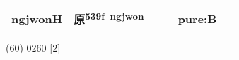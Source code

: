 \documentclass[14pt,a4paper]{scrartcl}
\begin{document}
\begin{longtable}[c]{@{}llllll@{}}
\begin{minipage}[t]{0.14\columnwidth}
ngjwonH
\strut\end{minipage} &
\begin{minipage}[t]{0.14\columnwidth}\raggedright\strut
原\textsuperscript{539f~ngjwon}
\strut\end{minipage} &
\begin{minipage}[t]{0.14\columnwidth}\raggedright\strut
\strut\end{minipage} &
\begin{minipage}[t]{0.14\columnwidth}\raggedright\strut
\strut\end{minipage} &
\begin{minipage}[t]{0.14\columnwidth}\raggedright\strut
pure:B
\strut\end{minipage}\tabularnewline
\bottomrule
\end{longtable}

(60) 0260 {[}2{]}
\end{document}
